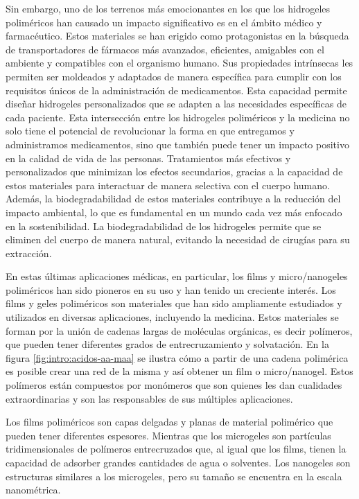 Sin embargo, uno de los terrenos m\'as emocionantes en los que los hidrogeles polim\'ericos han causado un impacto significativo es en el \'ambito m\'edico y farmac\'eutico. Estos materiales se han erigido como protagonistas en la b\'usqueda de transportadores de f\'armacos m\'as avanzados, eficientes, amigables con el ambiente y compatibles con el organismo humano. Sus propiedades intr\'insecas les permiten ser moldeados y adaptados de manera espec\'ifica para cumplir con los requisitos \'unicos de la administraci\'on de medicamentos.
Esta capacidad permite dise\~nar hidrogeles personalizados que se adapten a las necesidades espec\'ificas de cada paciente.
Esta intersecci\'on entre los hidrogeles polim\'ericos y la medicina no solo tiene el potencial de revolucionar la forma en que entregamos y administramos medicamentos, sino que tambi\'en puede tener un impacto positivo en la calidad de vida de las personas. Tratamientos m\'as efectivos y personalizados que minimizan los efectos secundarios, gracias a la capacidad de estos materiales para interactuar de manera selectiva con el cuerpo humano. Adem\'as, la biodegradabilidad de estos materiales contribuye a la reducci\'on del impacto ambiental, lo que es fundamental en un mundo cada vez m\'as enfocado en la sostenibilidad.
La biodegradabilidad de los hidrogeles permite que se eliminen del cuerpo de manera natural, evitando la necesidad de cirug\'ias para su extracci\'on.

En estas \'ultimas aplicaciones m\'edicas, en particular, los films y micro/nanogeles polim\'ericos han sido pioneros en su uso y han tenido un creciente inter\'es.
Los films y geles polim\'ericos son materiales que han sido ampliamente estudiados y utilizados en diversas aplicaciones, incluyendo la medicina.
Estos materiales se forman por la uni\'on de cadenas largas de mol\'eculas org\'anicas, es decir pol\'imeros, que pueden tener diferentes grados de entrecruzamiento y solvataci\'on. En la figura \ref{fig:intro:acidos-aa-maa} se ilustra c\'omo a partir de una cadena polim\'erica es posible crear una red de la misma y as\'i obtener un film o micro/nanogel. Estos pol\'imeros est\'an compuestos por mon\'omeros que son quienes les dan cualidades extraordinarias y son las responsables de sus m\'ultiples aplicaciones.

Los films polim\'ericos son capas delgadas y planas de material polim\'erico que pueden tener diferentes espesores. Mientras que los microgeles son part\'iculas tridimensionales de pol\'imeros entrecruzados que, al igual que los films, tienen la capacidad de adsorber grandes cantidades de agua o solventes. Los nanogeles son estructuras similares a los microgeles, pero su tama\~no se encuentra en la escala nanom\'etrica.


